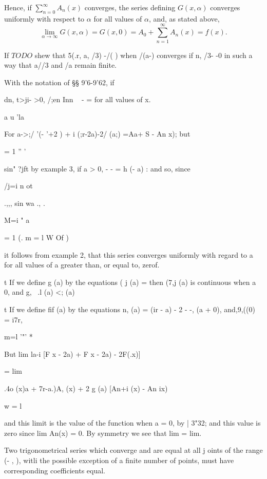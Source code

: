 Hence, if $\sum_{n=0}^{\infty} A_{n}(x)$ converges, the series defining $G(x,\alpha)$
converges uniformly with respect to $\alpha$ for all values of $\alpha$, and, as stated above,
$$
\lim_{\alpha \rightarrow \infty} G(x, \alpha)
= G(x,0)
= A_{0} + \sum_{n=1}^{\infty} A_{n}(x)
= f(x).
$$

\begin{wandwexample}
  If
  $TODO$
  shew that 5(.r, a, /3) -/( ) when /(a-) converges if n, /3- -0 in such a
way that a//3 and /a remain finite. 
\end{wandwexample}
With the notation of §§ 9'6-9'62, if

dn, t>ji- >0, /;en Inn ~ - = for all values of x.

a u 'la

For a->;/ '(- '+2 ) + i (;r-2a)-2/ (a;) =Aa+ S - An x); but

  = 1 '' '

  sin" ?jft by  example 3, if a > 0, - - = h (\pi - a) : and so,
since

/j=i n ot

.,,, sin wa ., .

M=i " a

  = 1 (. m = l W Of )

it follows from  example 2, that this series converges uniformly
with regard to a for all values of a greater than, or equal to, zerof.

t If we define g (a)
by the equations ( j (a) = then (7,j (a) is continuous when a 0, and
g, \ .l (a) <; (a)

t If we define fif (a) by the equations n, (a) = (ir - a) - 2 - -,
(a + 0), and,9,((0) = i7r,

m=l '"' *

%
%

But lim la-i [F x - 2a) + F x - 2a) - 2F(.x)]

= lim

.4o (x)a + 7r-a.)A, (x) + 2 g (a) [An+i (x) - An ix)

w = l

and this limit is the value of the function when a = 0, by | 3"32;
and this value is zero since lim An(x) = 0. By symmetry we see that
lim = lim.


Two trigonometrical series which converge and are equal at all j oints
of the range (- \pi, \pi), witli the possible exception of a finite
number of points, must have corresponding coefficients equal.

